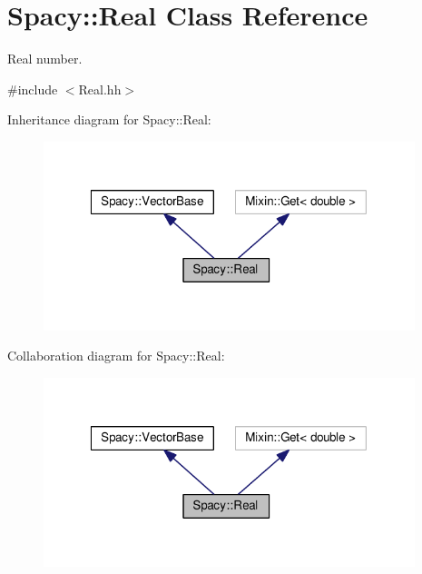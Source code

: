 \hypertarget{classSpacy_1_1Real}{\section{Spacy\-:\-:Real Class Reference}
\label{classSpacy_1_1Real}
}


Real number.  




{\ttfamily \#include $<$Real.\-hh$>$}



Inheritance diagram for Spacy\-:\-:Real\-:
\nopagebreak
\begin{figure}[H]
\begin{center}
\leavevmode
\includegraphics[width=307pt]{classSpacy_1_1Real__inherit__graph}
\end{center}
\end{figure}


Collaboration diagram for Spacy\-:\-:Real\-:
\nopagebreak
\begin{figure}[H]
\begin{center}
\leavevmode
\includegraphics[width=307pt]{classSpacy_1_1Real__coll__graph}
\end{center}
\end{figure}
